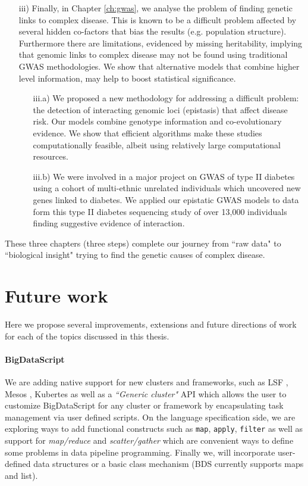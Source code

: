 \begin{itemize}
\item[iii)] Finally, in Chapter \ref{ch:gwas}, we analyse the problem of finding genetic links to complex disease. 
This is known to be a difficult problem affected by several hidden co-factors that bias the results (e.g. population structure). 
Furthermore there are limitations, evidenced by missing heritability, implying that genomic links to complex disease may not be found using traditional GWAS methodologies. 
We show that alternative models that combine higher level information, may help to boost statistical significance. 

	\begin{itemize}
		\item[iii.a)] We proposed a new methodology for addressing a difficult problem: the detection of interacting genomic loci (epistasis) that affect disease risk. 
		Our models combine genotype information and co-evolutionary evidence. We show that efficient algorithms make these studies computationally feasible, albeit using relatively large computational resources.
	
		\item[iii.b)] We were involved in a major project on GWAS of type II diabetes using a cohort of multi-ethnic unrelated individuals which uncovered new genes linked to diabetes. 
		We applied our epistatic GWAS models to data form this type II diabetes sequencing study of over 13,000 individuals finding suggestive evidence of interaction.
			\end{itemize}
	
\end{itemize}

These three chapters (three steps) complete our journey from ``raw data" to ``biological insight" trying to find the genetic causes of complex disease.

\section{Future work}

Here we propose several improvements, extensions and future directions of work for each of the topics discussed in this thesis. \\

\paragraph{BigDataScript}
We are adding native support for new clusters and frameworks, such as LSF \cite{lsf}, Mesos \cite{hindman2011mesos}, Kubertes \cite{kubernetes} as well as a \textit{``Generic cluster"} API which allows the user to customize BigDataScript for any cluster or framework by encapsulating task management via user defined scripts. 
On the language specification side, we are exploring ways to add functional constructs such as \texttt{map}, \texttt{apply}, \texttt{filter} as well as support for \textit{map/reduce} and \textit{scatter/gather} which are convenient ways to define some problems in data pipeline programming. 
Finally we, will incorporate user-defined data structures or a basic class mechanism (BDS currently supports maps and list).

